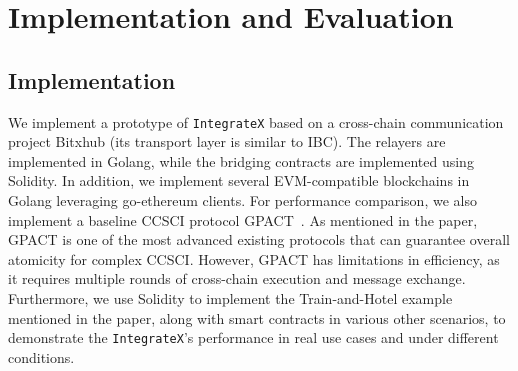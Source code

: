 \section{Implementation and Evaluation}\label{evaluation}


\subsection{Implementation}
We implement a prototype of \texttt{IntegrateX} based on a cross-chain communication project Bitxhub \cite{ye2020bitxhub} (its transport layer is similar to IBC). 
The relayers are implemented in Golang, while the bridging contracts are implemented using Solidity.
In addition, we implement several EVM-compatible blockchains in Golang leveraging go-ethereum clients.
For performance comparison, we also implement a baseline CCSCI protocol GPACT~\cite{robinson2021general}. 
As mentioned in the paper, GPACT is one of the most advanced existing protocols that can guarantee overall atomicity for complex CCSCI. 
However, GPACT has limitations in efficiency, as it requires multiple rounds of cross-chain execution and message exchange.
Furthermore, we use Solidity to implement the Train-and-Hotel example mentioned in the paper, along with smart contracts in various other scenarios, to demonstrate the \texttt{IntegrateX}'s performance in real use cases and under different conditions.


